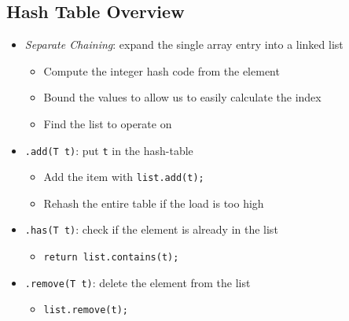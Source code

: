 \documentclass[10pt]{article}
\begin{document}
\subsection*{Hash Table Overview}
\begin{itemize}
    \item \textit{Separate Chaining}: expand the single array entry into a linked list
    \begin{itemize}
        \item Compute the integer hash code from the element
        \item Bound the values to allow us to easily calculate the index
        \item Find the list to operate on
    \end{itemize}
    \item \texttt{.add(T t)}: put \texttt{t} in the hash-table
    \begin{itemize}
        \item Add the item with \texttt{list.add(t);}
        \item Rehash the entire table if the load is too high
    \end{itemize}
    \item \texttt{.has(T t)}: check if the element is already in the list
    \begin{itemize}
        \item \texttt{return list.contains(t);}
    \end{itemize}
    \item \texttt{.remove(T t)}: delete the element from the list
    \begin{itemize}
        \item \texttt{list.remove(t);}
    \end{itemize}
\end{itemize}
\end{document}
